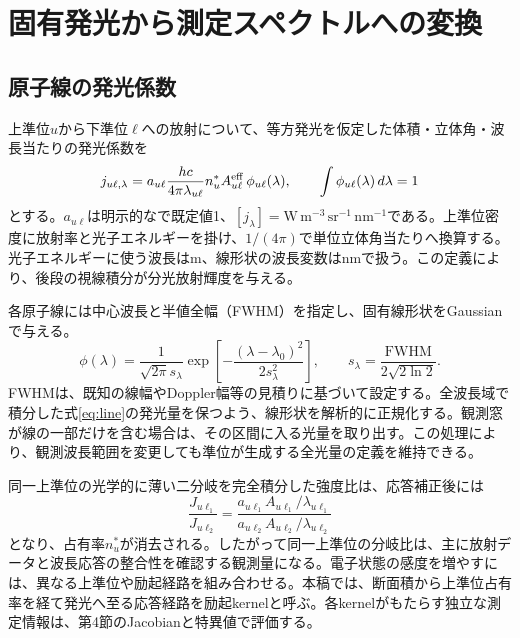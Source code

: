 \section{固有発光から測定スペクトルへの変換}
\subsection{原子線の発光係数}
上準位$u$から下準位$\ell$への放射について、等方発光を仮定した体積・立体角・波長当たりの発光係数を
\begin{equation}
j_{u\ell,\lambda}=a_{u\ell}\frac{hc}{4\pi\lambda_{u\ell}}
n_u^*A^{\mathrm{eff}}_{u\ell}\,\phi_{u\ell}(\lambda),\qquad
\int\phi_{u\ell}(\lambda)\,d\lambda=1
\label{eq:line}
\end{equation}
とする。$a_{u\ell}$は明示的なで既定値1、$[j_\lambda]=\mathrm{W\,m^{-3}\,sr^{-1}\,nm^{-1}}$である。上準位密度に放射率と光子エネルギーを掛け、$1/(4\pi)$で単位立体角当たりへ換算する。光子エネルギーに使う波長はm、線形状の波長変数はnmで扱う。この定義により、後段の視線積分が分光放射輝度を与える。

各原子線には中心波長と半値全幅（FWHM）を指定し、固有線形状をGaussianで与える。
\begin{equation}
\phi(\lambda)=\frac{1}{\sqrt{2\pi}s_\lambda}
\exp\!\left[-\frac{(\lambda-\lambda_0)^2}{2s_\lambda^2}\right],\qquad
s_\lambda=\frac{\mathrm{FWHM}}{2\sqrt{2\ln2}}.
\label{eq:gaussian}
\end{equation}
FWHMは、既知の線幅やDoppler幅等の見積りに基づいて設定する。全波長域で積分した式\eqref{eq:line}の発光量を保つよう、線形状を解析的に正規化する。観測窓が線の一部だけを含む場合は、その区間に入る光量を取り出す。この処理により、観測波長範囲を変更しても準位が生成する全光量の定義を維持できる。

同一上準位の光学的に薄い二分岐を完全積分した強度比は、応答補正後には
\begin{equation}
\frac{J_{u\ell_1}}{J_{u\ell_2}}
=\frac{a_{u\ell_1}A_{u\ell_1}/\lambda_{u\ell_1}}
{a_{u\ell_2}A_{u\ell_2}/\lambda_{u\ell_2}}
\label{eq:branchratio}
\end{equation}
となり、占有率$n_u^*$が消去される。したがって同一上準位の分岐比は、主に放射データと波長応答の整合性を確認する観測量になる。電子状態の感度を増やすには、異なる上準位や励起経路を組み合わせる。本稿では、断面積から上準位占有率を経て発光へ至る応答経路を励起kernelと呼ぶ。各kernelがもたらす独立な測定情報は、第4節のJacobianと特異値で評価する。

